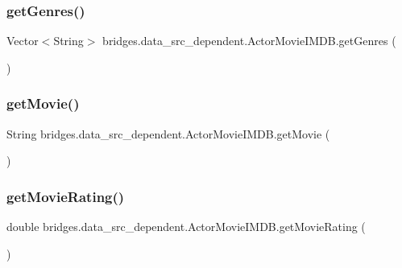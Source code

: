 \subsubsection{\texorpdfstring{get\+Genres()}{getGenres()}}
{\footnotesize\ttfamily Vector$<$String$>$ bridges.\+data\+\_\+src\+\_\+dependent.\+Actor\+Movie\+I\+M\+D\+B.\+get\+Genres (\begin{DoxyParamCaption}{ }\end{DoxyParamCaption})}

\hypertarget{classbridges_1_1data__src__dependent_1_1_actor_movie_i_m_d_b_af44503937d5b0d23a2347e752f435a32}{}\label{classbridges_1_1data__src__dependent_1_1_actor_movie_i_m_d_b_af44503937d5b0d23a2347e752f435a32} 
\subsubsection{\texorpdfstring{get\+Movie()}{getMovie()}}
{\footnotesize\ttfamily String bridges.\+data\+\_\+src\+\_\+dependent.\+Actor\+Movie\+I\+M\+D\+B.\+get\+Movie (\begin{DoxyParamCaption}{ }\end{DoxyParamCaption})}

\hypertarget{classbridges_1_1data__src__dependent_1_1_actor_movie_i_m_d_b_a3c13fb368acf3daf652dcaec37ae4809}{}\label{classbridges_1_1data__src__dependent_1_1_actor_movie_i_m_d_b_a3c13fb368acf3daf652dcaec37ae4809} 
\subsubsection{\texorpdfstring{get\+Movie\+Rating()}{getMovieRating()}}
{\footnotesize\ttfamily double bridges.\+data\+\_\+src\+\_\+dependent.\+Actor\+Movie\+I\+M\+D\+B.\+get\+Movie\+Rating (\begin{DoxyParamCaption}{ }\end{DoxyParamCaption})}

